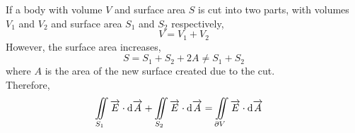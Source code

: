 \documentclass[fleqn, a4paper, 12pt, twoside]{article}
\theoremstyle{definition}
\theoremstyle{theorem}
\begin{document}
If a body with volume $V$ and surface area $S$ is cut into two parts, with volumes $V_1$ and $V_2$ and surface area $S_1$ and $S_2$ respectively,
\begin{equation*}
	V = V_1 + V_2
\end{equation*}
However, the surface area increases,
\begin{equation*}
	S = S_1 + S_2 + 2 A \neq S_1 + S_2
\end{equation*}
where $A$ is the area of the new surface created due to the cut.\\
Therefore,
\begin{align*}
	\iint\limits_{S_1} \overrightarrow{E} \cdot \dif \overrightarrow{A} + \iint\limits_{S_2} \overrightarrow{E} \cdot \dif \overrightarrow{A} &= \iint\limits_{\partial V} \overrightarrow{E} \cdot \dif \overrightarrow{A}
\end{align*}
\end{document}
